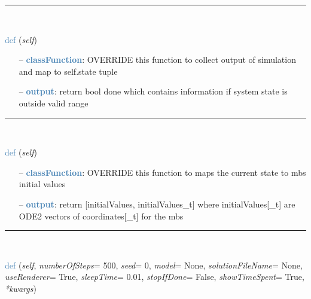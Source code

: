 \begin{itemize}[leftmargin=1.4cm]
%
\noindent\rule{8cm}{0.75pt}\vspace{1pt} \\ 
\begin{flushleft}
\noindent \textcolor{steelblue}{def {\bf {}}}\label{sec:artificialIntelligence:OpenAIGymInterfaceEnv:Output2StateAndDone}
({\it self})
\end{flushleft}
\setlength{\itemindent}{0.7cm}
\begin{itemize}[leftmargin=0.7cm]
  \item[--]  \textcolor{steelblue}{\bf classFunction}: OVERRIDE this function to collect output of simulation and map to self.state tuple  \item[--]  \textcolor{steelblue}{\bf output}: return bool done which contains information if system state is outside valid range\vspace{12pt}\end{itemize}
%
\noindent\rule{8cm}{0.75pt}\vspace{1pt} \\ 
\begin{flushleft}
\noindent \textcolor{steelblue}{def {\bf {}}}\label{sec:artificialIntelligence:OpenAIGymInterfaceEnv:State2InitialValues}
({\it self})
\end{flushleft}
\setlength{\itemindent}{0.7cm}
\begin{itemize}[leftmargin=0.7cm]
  \item[--]  \textcolor{steelblue}{\bf classFunction}: OVERRIDE this function to maps the current state to mbs initial values  \item[--]  \textcolor{steelblue}{\bf output}: return [initialValues, initialValues\_t] where initialValues[\_t] are ODE2 vectors of coordinates[\_t] for the mbs\vspace{12pt}\end{itemize}
%
\noindent\rule{8cm}{0.75pt}\vspace{1pt} \\ 
\begin{flushleft}
\noindent \textcolor{steelblue}{def {\bf {}}}\label{sec:artificialIntelligence:OpenAIGymInterfaceEnv:TestModel}
({\it self}, {\it numberOfSteps}= 500, {\it seed}= 0, {\it model}= None, {\it solutionFileName}= None, {\it useRenderer}= True, {\it sleepTime}= 0.01, {\it stopIfDone}= False, {\it showTimeSpent}= True, {\it **kwargs})

\end{flushleft}
\end{itemize}
